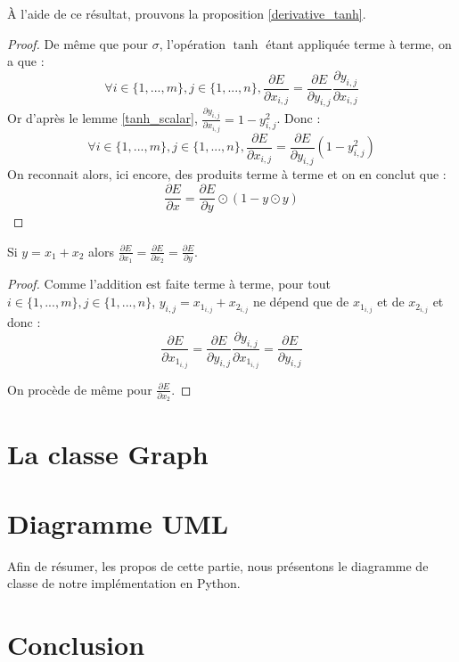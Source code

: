 À l'aide de ce résultat, prouvons la proposition \ref{derivative_tanh}.

\begin{proof}
De même que pour $\sigma$, l'opération $\tanh$ étant appliquée terme à terme, on a que :
$$
\forall i \in \{1, ..., m\}, j \in \{1, ..., n\}, \frac{\partial E}{\partial x_{i, j}} = \frac{\partial E}{\partial y_{i, j}}\frac{\partial y_{i, j}}{\partial x_{i, j}}
$$
Or d'après le lemme \ref{tanh_scalar}, $\frac{\partial y_{i, j}}{\partial x_{i, j}} = 1 - y_{i, j}^2$. Donc :
$$
\forall i \in \{1, ..., m\}, j \in \{1, ..., n\}, \frac{\partial E}{\partial x_{i, j}} = \frac{\partial E}{\partial y_{i, j}}(1 - y_{i, j}^2)
$$
On reconnait alors, ici encore, des produits terme à terme et on en conclut que :
$$
\frac{\partial E}{\partial x} = \frac{\partial E}{\partial y} \odot (1 - y \odot y)
$$
\end{proof}

\begin{proposition}
Si $y = x_1 + x_2$ alors $\frac{\partial E}{\partial x_1} = \frac{\partial E}{\partial x_2} = \frac{\partial E}{\partial y}$.
\end{proposition}

\begin{proof}
Comme l'addition est faite terme à terme, pour tout $i \in \{1, ..., m\}, j \in \{1, ..., n\}$, $y_{i, j} = x_{1_{i, j}} + x_{2_{i, j}}$ ne dépend que de $x_{1_{i, j}}$ et de $x_{2_{i, j}}$ et donc :
$$
\frac{\partial E}{\partial x_{1_{i, j}}} = \frac{\partial E}{\partial y_{i, j}}\frac{\partial y_{i, j}}{\partial x_{1_{i, j}}} = \frac{\partial E}{\partial y_{i, j}}
$$ 

On procède de même pour $\frac{\partial E}{\partial x_2}$.
\end{proof}

\section{La classe Graph}


\section{Diagramme UML}

Afin de résumer, les propos de cette partie, nous présentons le diagramme de classe de notre implémentation en Python.


\section{Conclusion}

